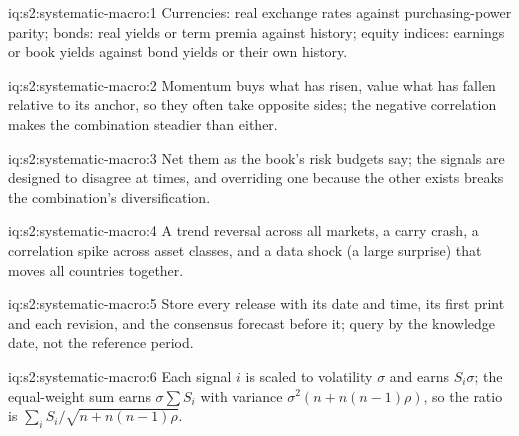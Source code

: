 \begin{solution}{iq:s2:systematic-macro:1}
Currencies: real exchange rates against purchasing-power parity; bonds: real yields or term premia against history; equity indices: earnings or book
yields against bond yields or their own history.
\end{solution}

\begin{solution}{iq:s2:systematic-macro:2}
Momentum buys what has risen, value what has fallen relative to its anchor, so they often take opposite sides; the negative correlation makes the
combination steadier than either.
\end{solution}

\begin{solution}{iq:s2:systematic-macro:3}
Net them as the book's risk budgets say; the signals are designed to disagree at times, and overriding one because the other exists breaks the
combination's diversification.
\end{solution}

\begin{solution}{iq:s2:systematic-macro:4}
A trend reversal across all markets, a carry crash, a correlation spike across asset classes, and a data shock (a large surprise) that moves all
countries together.
\end{solution}

\begin{solution}{iq:s2:systematic-macro:5}
Store every release with its date and time, its first print and each revision, and the consensus forecast before it; query by the knowledge date, not
the reference period.
\end{solution}

\begin{solution}{iq:s2:systematic-macro:6}
Each signal $i$ is scaled to volatility $\sigma$ and earns $S_i\sigma$; the equal-weight sum earns $\sigma\sum S_i$ with variance $\sigma^2(n +
n(n - 1)\rho)$, so the ratio is $\sum_i S_i/\sqrt{n + n(n - 1)\rho}$.
\end{solution}
